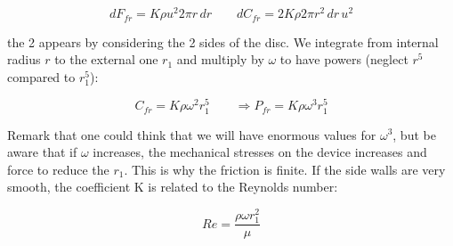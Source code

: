 \begin{equation}
dF_{fr} = K\rho u^2 2\pi r \,dr \qquad dC_{fr} = 2K\rho 2\pi r^2\, dr\, u^2 
\end{equation}

the 2 appears by considering the 2 sides of the disc. We integrate from internal radius $r$ to the external one $r_1$ and multiply by $\omega$ to have powers (neglect $r^5$ compared to $r_1^5$): 

\begin{equation}
C_{fr} = K\rho \omega ^2 r_1^5 \qquad \Rightarrow P_{fr}= K\rho \omega ^3 r_1^5
\end{equation}

Remark that one could think that we will have enormous values for $\omega ^3$, but be aware that if $\omega$ increases, the mechanical stresses on the device increases and force to reduce the $r_1$. This is why the friction is finite. If the side walls are very smooth, the coefficient K is related to the Reynolds number: 

\begin{equation}
Re = \frac{\rho \omega r_1^2}{\mu}
\end{equation}

